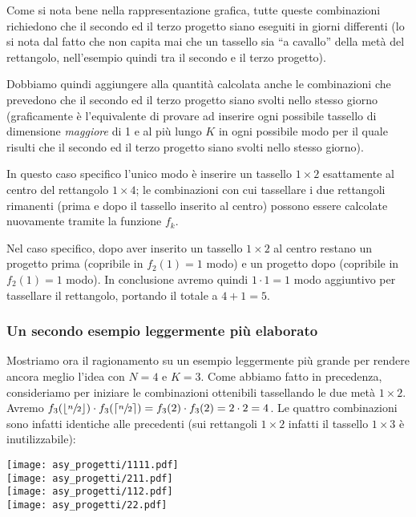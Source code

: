 \begin{solution}
Come si nota bene nella rappresentazione grafica, tutte queste combinazioni richiedono che il secondo ed il terzo progetto siano eseguiti in giorni differenti (lo si nota dal fatto che non capita mai che un tassello sia ``a cavallo'' della metà del rettangolo, nell'esempio quindi tra il secondo e il terzo progetto).

Dobbiamo quindi aggiungere alla quantità calcolata anche le combinazioni che prevedono che il secondo ed il terzo progetto siano svolti nello stesso giorno (graficamente è l'equivalente di provare ad inserire ogni possibile tassello di dimensione \emph{maggiore} di 1 e al più lungo $K$ in ogni possibile modo per il quale risulti che il secondo ed il terzo progetto siano svolti nello stesso giorno).

In questo caso specifico l'unico modo è inserire un tassello $1 \times 2$ esattamente al centro del rettangolo $1 \times 4$; le combinazioni con cui tassellare i due rettangoli rimanenti (prima e dopo il tassello inserito al centro) possono essere calcolate nuovamente tramite la funzione $f_k$.

Nel caso specifico, dopo aver inserito un tassello $1 \times 2$ al centro restano un progetto prima (copribile in $f_2(1) = 1$ modo) e un progetto dopo (copribile in $f_2(1) = 1$ modo). In conclusione avremo quindi $1 \cdot 1 = 1$ modo aggiuntivo per tassellare il rettangolo, portando il totale a $4 + 1 = 5$.

\subsubsection*{Un secondo esempio leggermente più elaborato}

Mostriamo ora il ragionamento su un esempio leggermente più grande per rendere ancora meglio l'idea con $N=4$ e $K=3$. Come abbiamo fatto in precedenza, consideriamo per iniziare le combinazioni ottenibili tassellando le due metà $1 \times 2$. Avremo $f_3(\lfloor\sfrac{n}{2}\rfloor) \cdot f_3(\lceil\sfrac{n}{2}\rceil) = f_3(2) \cdot f_3(2) = 2 \cdot 2 = 4$. Le quattro combinazioni sono infatti identiche alle precedenti (sui rettangoli $1 \times 2$ infatti il tassello $1 \times 3$ è inutilizzabile):

\begin{center}
\texttt{[image: asy\_progetti/1111.pdf]} \\
\texttt{[image: asy\_progetti/211.pdf]} \\
\texttt{[image: asy\_progetti/112.pdf]} \\
\texttt{[image: asy\_progetti/22.pdf]} \\
\end{center}


\end{solution}

